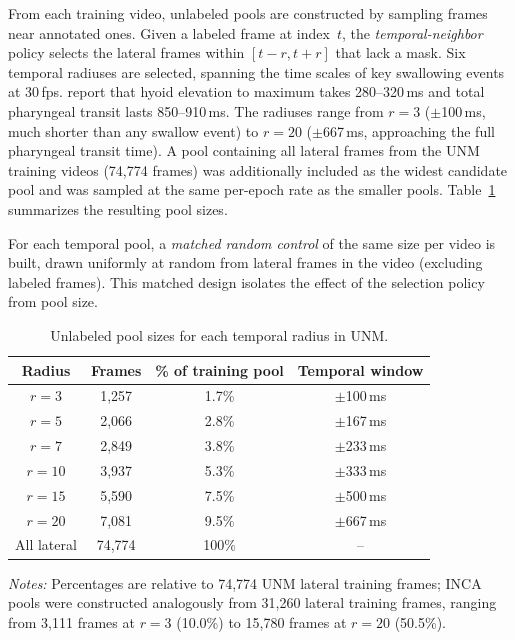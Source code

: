 \documentclass[a4paper,fleqn]{cas-dc}
\begin{document}
From each training video, unlabeled pools are constructed by sampling frames near annotated ones.
Given a labeled frame at index~$t$, the \emph{temporal-neighbor} policy selects the lateral frames within $[t{-}r, t{+}r]$ that lack a mask.
Six temporal radiuses are selected, spanning the time scales of key swallowing events at 30\,fps.
\citet{ref_kendall2000} report that hyoid elevation to maximum takes 280--320\,ms and total pharyngeal transit lasts 850--910\,ms.
The radiuses range from $r{=}3$ ($\pm$100\,ms, much shorter than any swallow event) to $r{=}20$ ($\pm$667\,ms, approaching the full pharyngeal transit time).
A pool containing all lateral frames from the UNM training videos (74{,}774 frames) was additionally included as the widest candidate pool and was sampled at the same per-epoch rate as the smaller pools.
Table~\ref{tab:pools} summarizes the resulting pool sizes.

For each temporal pool, a \emph{matched random control} of the same size per video is built, drawn uniformly at random from lateral frames in the video (excluding labeled frames).
This matched design isolates the effect of the selection policy from pool size.

\begin{table}[!t]
\centering
\caption{Unlabeled pool sizes for each temporal radius in UNM.}
\label{tab:pools}
\setlength{\tabcolsep}{4pt}
\begin{tabular}{@{}cccc@{}}
\toprule
\textbf{Radius} & \textbf{Frames} & \textbf{\% of training pool} & \textbf{Temporal window} \\
\midrule
$r{=}3$   & 1{,}257  & 1.7\%   & $\pm$100\,ms \\
$r{=}5$   & 2{,}066  & 2.8\%   & $\pm$167\,ms \\
$r{=}7$   & 2{,}849  & 3.8\%   & $\pm$233\,ms \\
$r{=}10$  & 3{,}937  & 5.3\%   & $\pm$333\,ms \\
$r{=}15$  & 5{,}590  & 7.5\%   & $\pm$500\,ms \\
$r{=}20$  & 7{,}081  & 9.5\%   & $\pm$667\,ms \\
All lateral & 74{,}774 & 100\% & -- \\
\bottomrule
\end{tabular}
\medskip
\noindent\begin{minipage}{\linewidth}
\footnotesize\textit{Notes:} Percentages are relative to 74{,}774 UNM lateral training frames; INCA pools were constructed analogously from 31{,}260 lateral training frames, ranging from 3{,}111 frames at $r{=}3$ (10.0\%) to 15{,}780 frames at $r{=}20$ (50.5\%).
\end{minipage}
\end{table}
\end{document}
